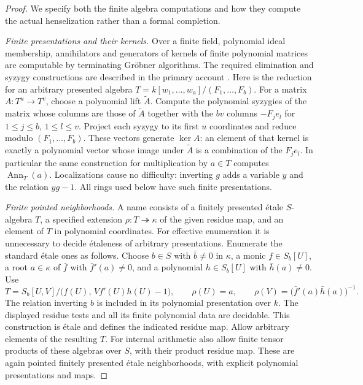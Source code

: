 \begin{proof}
We specify both the finite algebra computations and
how they compute the actual henselization rather
than a formal completion.

\emph{Finite presentations and their kernels.}
Over a finite field, polynomial ideal membership,
annihilators and generators of kernels of finite
polynomial matrices are computable by terminating
Gr\"obner algorithms.  The required elimination and
syzygy constructions are described in the primary
account \cite[Sections 4.3--4.4 and 5.1--5.3,
pp.\ 240--249]{C-BuchbergerSystems2001}.
Here is the reduction for an arbitrary presented
algebra $T=k[w_1,\ldots,w_a]/(F_1,\ldots,F_b)$.
For a matrix $A:T^u\to T^v$, choose a polynomial
lift $\widetilde A$.  Compute the polynomial
syzygies of the matrix whose columns are those
of $\widetilde A$ together with the $bv$ columns
$-F_j e_l$ for $1\leq j\leq b$, $1\leq l\leq v$.
Project each syzygy to its first $u$ coordinates
and reduce modulo $(F_1,\ldots,F_b)$.
These vectors generate $\ker A$: an element of
that kernel is exactly a polynomial vector whose
image under $\widetilde A$ is a combination of
the $F_j e_l$.
In particular the same construction for multiplication
by $a\in T$ computes $\operatorname{Ann}_T(a)$.
Localizations cause no difficulty: inverting $g$
adds a variable $y$ and the relation $yg-1$.
All rings used below have such finite presentations.

\emph{Finite pointed neighborhoods.}
A name consists of a finitely presented \'etale
$S$-algebra $T$, a specified extension
$\rho:T\twoheadrightarrow\kappa$ of the given
residue map, and an element of $T$ in polynomial
coordinates.  For effective enumeration it is
unnecessary to decide \'etaleness of arbitrary
presentations.  Enumerate the standard \'etale
ones as follows.  Choose $b\in S$ with
$\bar b\ne0$ in $\kappa$, a monic
$f\in S_b[U]$, a root $a\in\kappa$ of
$\bar f$ with $\bar f'(a)\ne0$, and a polynomial
$h\in S_b[U]$ with $\bar h(a)\ne0$.
Use
\[
 T=S_b[U,V]/\bigl(f(U),\,V f'(U)h(U)-1\bigr),
 \qquad
 \rho(U)=a,\qquad
 \rho(V)=\bigl(\bar f'(a)\bar h(a)\bigr)^{-1}.       \tag{C.3.HD5}
\]
The relation inverting $b$ is included in its
polynomial presentation over $k$.
The displayed residue tests and all its finite
polynomial data are decidable.  This construction
is \'etale and defines the indicated residue map.
Allow arbitrary elements of the resulting $T$.
For internal arithmetic also allow finite tensor
products of these algebras over $S$, with their
product residue map.  These are again pointed
finitely presented \'etale neighborhoods, with
explicit polynomial presentations and maps.


\end{proof}

